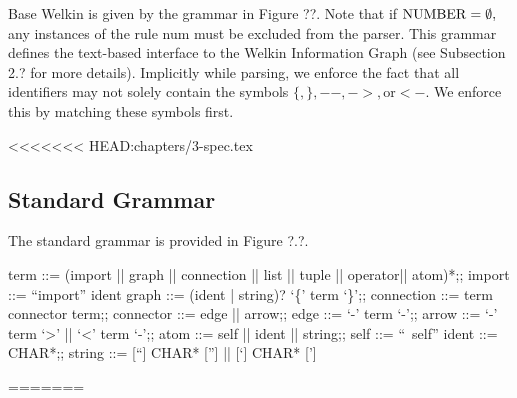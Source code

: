 Base Welkin is given by the grammar in Figure ??. Note that if $\mathrm{NUMBER}= \emptyset,$ any instances of the rule num must be excluded from the parser. This grammar defines the text-based interface to the Welkin Information Graph (see Subsection 2.? for more details). Implicitly while parsing, we enforce the fact that all identifiers may not solely contain the symbols $\{, \}, --, ->, \text{or} <-.$ We enforce this by matching these symbols first.

<<<<<<< HEAD:chapters/3-spec.tex
\subsection{Standard Grammar}
The standard grammar is provided in Figure ?.?.
\begin{bnfgrammar}
	term ::= (import || graph || connection || list || tuple || operator|| atom)*;;
	import ::= ``import'' ident
	graph ::= (ident | string)? `\{' term `\}';;
	connection ::= term connector term;;
	connector ::= edge || arrow;;
	edge ::= `-' term `-';;
	arrow ::= `-' term `>' || `<' term `-';;
	atom ::= self || ident || string;;
	self ::= ``~self''
	ident ::= CHAR*;;
	string ::= [``] CHAR* [''] || [`] CHAR* [']
\end{bnfgrammar}
=======
